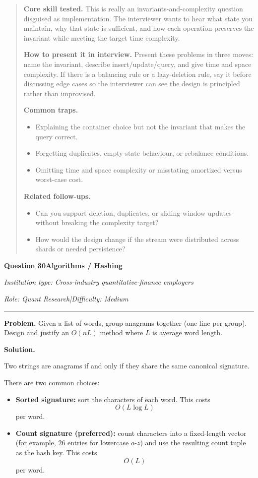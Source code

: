 \documentclass[11pt,letterpaper,openany]{book}
\newenvironment{EditorialNote}
  {\begin{quote}\small\setlength{\parskip}{0.25em}}
  {\end{quote}}
\newcommand{\QuestionSpacer}{\vspace{0.4em}}
\newcommand{\InterviewQuestionHeader}[5]{%
  \vspace{1.0em}%
  {\large\bfseries #1\enspace #4\par}%
  {\small\itshape Institution type: #2\par}%
  {\small\itshape Role: #3\enspace |\enspace Difficulty: #5\par}%
  \vspace{0.25em}\hrule\vspace{0.45em}%
}
\begin{document}
\begin{EditorialNote}


\textbf{Core skill tested.} This is really an invariants-and-complexity question disguised as implementation. The interviewer wants to hear what state you maintain, why that state is sufficient, and how each operation preserves the invariant while meeting the target time complexity.

\textbf{How to present it in interview.} Present these problems in three moves: name the invariant, describe insert/update/query, and give time and space complexity. If there is a balancing rule or a lazy-deletion rule, say it before discussing edge cases so the interviewer can see the design is principled rather than improvised.

\textbf{Common traps.}
\begin{itemize}
\item Explaining the container choice but not the invariant that makes the query correct.
\item Forgetting duplicates, empty-state behaviour, or rebalance conditions.
\item Omitting time and space complexity or misstating amortized versus worst-case cost.
\end{itemize}

\textbf{Related follow-ups.}
\begin{itemize}
\item Can you support deletion, duplicates, or sliding-window updates without breaking the complexity target?
\item How would the design change if the stream were distributed across shards or needed persistence?
\end{itemize}


\end{EditorialNote}
\QuestionSpacer

\InterviewQuestionHeader{Question 30}{Cross-industry quantitative-finance employers}{Quant Research}{Algorithms / Hashing}{Medium}
\textbf{Problem.} Given a list of words, group anagrams together (one line per group). Design and justify an \(O(nL)\) method where \(L\) is average word length.

\textbf{Solution.}

Two strings are anagrams if and only if they share the same canonical signature.

There are two common choices:

\begin{itemize}
\item \textbf{Sorted signature:} sort the characters of each word. This costs
\[
O(L\log L)
\]
per word.

\item \textbf{Count signature (preferred):} count characters into a fixed-length vector (for example, \(26\) entries for lowercase \(a\)-\(z\)) and use the resulting count tuple as the hash key. This costs
\[
O(L)
\]
per word.
\end{itemize}
\end{document}
